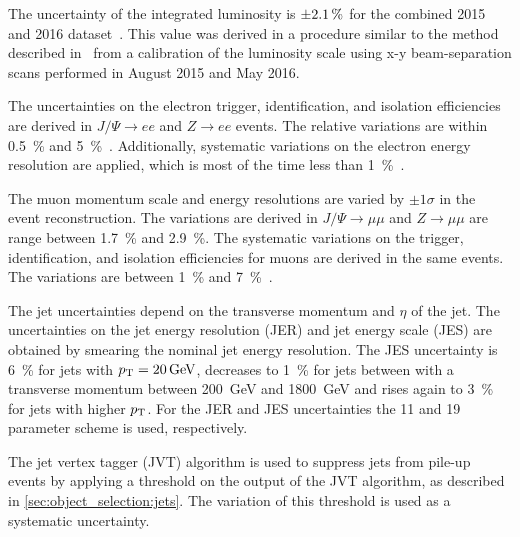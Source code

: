 \begin{description}[leftmargin=0cm]
    \item[Luminosity:] The uncertainty of the integrated luminosity is $\SI{\pm 2.1}{\percent}$ for the combined 2015 and 2016 dataset~\cite{LumiUncertRun2}.
        This value was derived in a procedure similar to the method described in~\cite{LumiUncertRun1}
        from a calibration of the luminosity scale using x-y beam-separation scans performed in August 2015 and May 2016.
    \item[Electrons:] The uncertainties on the electron trigger, identification, and isolation efficiencies
        are derived in $J/\Psi \to ee$ and $Z \to ee$ events. The relative variations are within \SI{0.5}{\percent}
        and \SI{5}{\percent}~\cite{ATLAS-CONF-2016-024,ElectronSFUncert}.
        Additionally, systematic variations on the electron energy resolution are applied, which is most of the
        time less than \SI{1}{\percent}~\cite{PERF-2013-05}.
    \item[Muons:] The muon momentum scale and energy resolutions are varied by $\pm 1 \sigma$
        in the event reconstruction. The variations are derived in $J/\Psi \to \mu\mu$ and $Z \to \mu\mu$
        are range between \SI{1.7}{\percent} and \SI{2.9}{\percent}.
        The systematic variations on the trigger, identification, and isolation efficiencies for muons
        are derived in the same events.
        The variations are between \SI{1}{\percent} and \SI{7}{\percent}~\cite{PERF-2015-10}.
    \item[Jet energy:] The jet uncertainties depend on the transverse momentum and $\eta$ of the jet.
        The uncertainties on the jet energy resolution (JER) and jet energy scale (JES) are obtained
        by smearing the nominal jet energy resolution.
        The JES uncertainty is \SI{6}{\percent} for jets with $\pt = \SI{20}{\GeV}$,
        decreases to \SI{1}{\percent} for jets between with a transverse momentum between \SI{200}{\GeV} and \SI{1800}{\GeV} and rises again to \SI{3}{\percent}
        for jets with higher $p_\text{T}$.
        For the JER and JES uncertainties the 11 and 19 parameter scheme is used, respectively.~\cite{ATL-PHYS-PUB-2015-015,PERF-2016-04}
    \item[Jet vertex tagger:] The jet vertex tagger (JVT) algorithm is used to suppress jets from pile-up events
        by applying a threshold on the output of the JVT algorithm, as described in \cref{sec:object_selection:jets}.
        The variation of this threshold is used as a systematic uncertainty.

\end{description}
